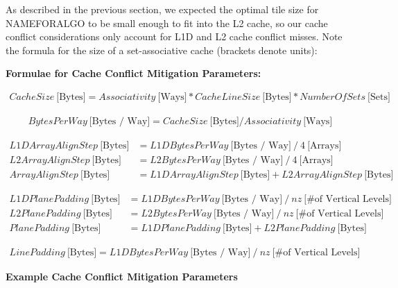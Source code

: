 \documentclass[conference]{IEEEtran}
\begin{document}
As described in the previous section, we expected the optimal tile size for
NAMEFORALGO to be small enough to fit into the L2 cache, so our cache conflict
considerations only account for L1D and L2 cache conflict misses. Note the
formula for the size of a set-associative cache (brackets denote units):

\begin{table}[t]
\centering
\caption{\textbf{Formulae for Cache Conflict Mitigation Parameters:}}

\begin{align*}
CacheSize \: \text{[Bytes]} = Associativity \: \text{[Ways]} * CacheLineSize \: \text{[Bytes]} * NumberOfSets \: \text{[Sets]}
\end{align*}

\begin{align*}
BytesPerWay \: \text{[Bytes / Way]} = CacheSize \: \text{[Bytes]} / Associativity \: \text{[Ways]}
\end{align*}

\begin{align*}
L1DArrayAlignStep \: \text{[Bytes]} &= L1DBytesPerWay \: \text{[Bytes / Way]} \: / \: 4 \: \text{[Arrays]} \\
L2ArrayAlignStep \: \text{[Bytes]}  &= L2BytesPerWay \: \text{[Bytes / Way]}  \: / \: 4 \: \text{[Arrays]} \\ 
ArrayAlignStep \: \text{[Bytes]}    &= L1DArrayAlignStep \: \text{[Bytes]} + L2ArrayAlignStep \: \text{[Bytes]}
\end{align*}

\begin{align*}
L1DPlanePadding \: \text{[Bytes]} &= L1DBytesPerWay \: \text{[Bytes / Way]} \: / \: nz \: \text{[\# of Vertical Levels]} \\ 
L2PlanePadding \: \text{[Bytes]}  &= L2BytesPerWay \: \text{[Bytes / Way]}  \: / \: nz \: \text{[\# of Vertical Levels]} \\
PlanePadding \: \text{[Bytes]}    &= L1DPlanePadding \: \text{[Bytes]} + L2PlanePadding \: \text{[Bytes]}
\end{align*}

\begin{align*}
LinePadding \: \text{[Bytes]} = L1DBytesPerWay \: \text{[Bytes / Way]} \: / \: nz \: \text{[\# of Vertical Levels]}
\end{align*}

\label{tab:conflict_mitigation_formulae}
\end{table}

\begin{table}[t]
\centering
\caption{\textbf{Example Cache Conflict Mitigation Parameters}}


\label{tab:example_conflict_mitigation_parameters}
\end{table}
\end{document}

